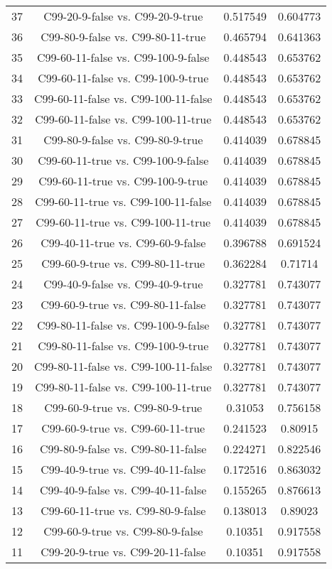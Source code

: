 \documentclass[a4paper,10pt]{article}
\begin{document}
\begin{landscape}
\begin{table}[!htp]
\begin{tabular}{cccc}
37&C99-20-9-false vs. C99-20-9-true&0.517549&0.604773\\
36&C99-80-9-false vs. C99-80-11-true&0.465794&0.641363\\
35&C99-60-11-false vs. C99-100-9-false&0.448543&0.653762\\
34&C99-60-11-false vs. C99-100-9-true&0.448543&0.653762\\
33&C99-60-11-false vs. C99-100-11-false&0.448543&0.653762\\
32&C99-60-11-false vs. C99-100-11-true&0.448543&0.653762\\
31&C99-80-9-false vs. C99-80-9-true&0.414039&0.678845\\
30&C99-60-11-true vs. C99-100-9-false&0.414039&0.678845\\
29&C99-60-11-true vs. C99-100-9-true&0.414039&0.678845\\
28&C99-60-11-true vs. C99-100-11-false&0.414039&0.678845\\
27&C99-60-11-true vs. C99-100-11-true&0.414039&0.678845\\
26&C99-40-11-true vs. C99-60-9-false&0.396788&0.691524\\
25&C99-60-9-true vs. C99-80-11-true&0.362284&0.71714\\
24&C99-40-9-false vs. C99-40-9-true&0.327781&0.743077\\
23&C99-60-9-true vs. C99-80-11-false&0.327781&0.743077\\
22&C99-80-11-false vs. C99-100-9-false&0.327781&0.743077\\
21&C99-80-11-false vs. C99-100-9-true&0.327781&0.743077\\
20&C99-80-11-false vs. C99-100-11-false&0.327781&0.743077\\
19&C99-80-11-false vs. C99-100-11-true&0.327781&0.743077\\
18&C99-60-9-true vs. C99-80-9-true&0.31053&0.756158\\
17&C99-60-9-true vs. C99-60-11-true&0.241523&0.80915\\
16&C99-80-9-false vs. C99-80-11-false&0.224271&0.822546\\
15&C99-40-9-true vs. C99-40-11-false&0.172516&0.863032\\
14&C99-40-9-false vs. C99-40-11-false&0.155265&0.876613\\
13&C99-60-11-true vs. C99-80-9-false&0.138013&0.89023\\
12&C99-60-9-true vs. C99-80-9-false&0.10351&0.917558\\
11&C99-20-9-true vs. C99-20-11-false&0.10351&0.917558\\

\end{tabular}
\end{table}
\end{landscape}
\end{document}
